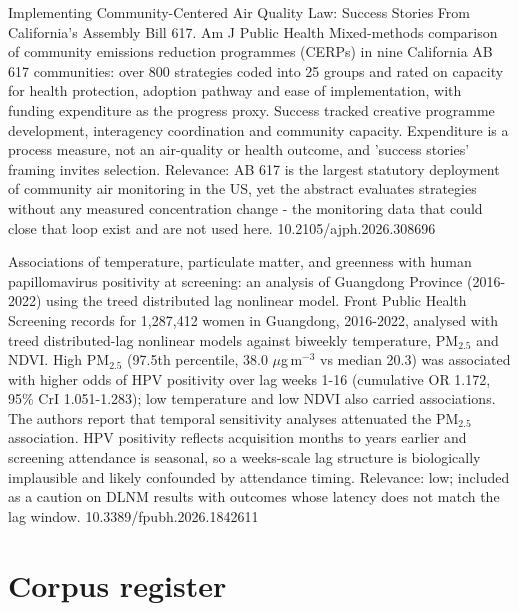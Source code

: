 \documentclass[10pt]{article}
\begin{document}
{Implementing Community-Centered Air Quality Law: Success Stories From California's Assembly Bill 617.}
{Am J Public Health}
{Mixed-methods comparison of community emissions reduction programmes (CERPs) in nine California AB 617 communities: over 800 strategies coded into 25 groups and rated on capacity for health protection, adoption pathway and ease of implementation, with funding expenditure as the progress proxy. Success tracked creative programme development, interagency coordination and community capacity. Expenditure is a process measure, not an air-quality or health outcome, and 'success stories' framing invites selection. Relevance: AB 617 is the largest statutory deployment of community air monitoring in the US, yet the abstract evaluates strategies without any measured concentration change - the monitoring data that could close that loop exist and are not used here.}
{10.2105/ajph.2026.308696}


{Associations of temperature, particulate matter, and greenness with human papillomavirus positivity at screening: an analysis of Guangdong Province (2016-2022) using the treed distributed lag nonlinear model.}
{Front Public Health}
{Screening records for 1,287,412 women in Guangdong, 2016-2022, analysed with treed distributed-lag nonlinear models against biweekly temperature, PM$_{2.5}$ and NDVI. High PM$_{2.5}$ (97.5th percentile, 38.0 $\mu$g\,m$^{-3}$ vs median 20.3) was associated with higher odds of HPV positivity over lag weeks 1-16 (cumulative OR 1.172, 95\% CrI 1.051-1.283); low temperature and low NDVI also carried associations. The authors report that temporal sensitivity analyses attenuated the PM$_{2.5}$ association. HPV positivity reflects acquisition months to years earlier and screening attendance is seasonal, so a weeks-scale lag structure is biologically implausible and likely confounded by attendance timing. Relevance: low; included as a caution on DLNM results with outcomes whose latency does not match the lag window.}
{10.3389/fpubh.2026.1842611}

\clearpage

\section*{\sffamily\bfseries\color{Deep}Corpus register}
\vspace{-1.5mm}{\color{Amber}\rule{\linewidth}{1.1pt}}\vspace{2.5mm}
\end{document}
